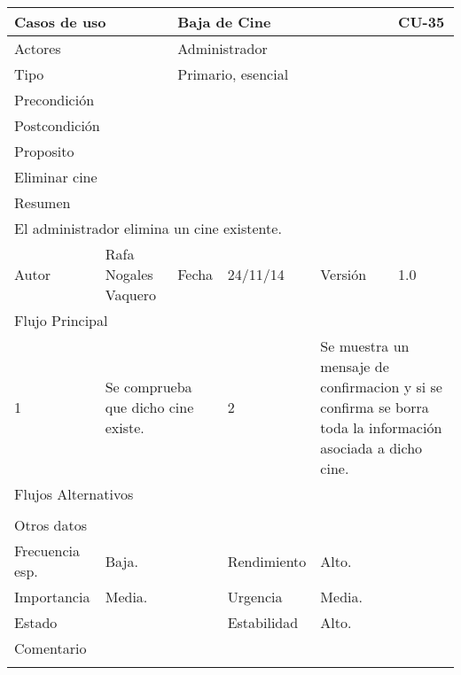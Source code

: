\documentclass{article}
\begin{document}
\begin{table}[h]
\begin{tabular}{|l|l|l|l|l|l|}
\hline
\multicolumn{2}{|p{2cm}|}{Casos de uso}  & \multicolumn{3}{p{7cm}|}{Baja de Cine} & CU-35 \\
\hline
\multicolumn{2}{|p{2cm}|}{Actores}       & \multicolumn{4}{p{8cm}|}{Administrador}        \\
\hline
\multicolumn{2}{|p{2cm}|}{Tipo}          & \multicolumn{4}{p{8cm}|}{Primario, esencial}        \\
\hline
\multicolumn{2}{|p{2cm}|}{Precondición}  & \multicolumn{4}{p{8cm}|}{}        \\
\hline
\multicolumn{2}{|p{2cm}|}{Postcondición} & \multicolumn{4}{p{8cm}|}{}        \\
\hline
\multicolumn{6}{|p{10cm}|}{Proposito}                                   \\
\hline
\multicolumn{6}{|p{10cm}|}{Eliminar cine}                                            \\
\hline
\multicolumn{6}{|p{10cm}|}{Resumen}                                 \\
\hline
\multicolumn{6}{|p{10cm}|}{El administrador elimina un cine existente.}                                            \\
\hline
Autor         &       Rafa Nogales Vaquero        &  Fecha   &  24/11/14   &   Versión  & 1.0\\
\hline
\multicolumn{6}{|p{10cm}|}{Flujo Principal}\\
\hline
\multicolumn{1}{|p{1cm}|}{1} & \multicolumn{2}{p{3cm}}{Se comprueba que dicho cine existe.} & \multicolumn{1}{|p{1cm}|}{2} & \multicolumn{2}{p{3cm}|}{Se muestra un mensaje de confirmacion y si se confirma se borra toda la información asociada a dicho cine.}\\
\hline
\multicolumn{6}{|p{10cm}|}{Flujos Alternativos}\\
\hline
\multicolumn{1}{|p{1cm}}{} & \multicolumn{5}{|p{9cm}|}{}\\
\hline
\multicolumn{6}{|p{10cm}|}{Otros datos}\\
\hline
\multicolumn{1}{|p{2cm}|}{Frecuencia esp.} & \multicolumn{2}{p{3cm}}{Baja.} & \multicolumn{1}{|p{2cm}|}{Rendimiento} & \multicolumn{2}{p{3cm}|}{Alto.}\\
\hline
\multicolumn{1}{|p{2cm}|}{Importancia} & \multicolumn{2}{p{3cm}}{Media.} & \multicolumn{1}{|p{2cm}|}{Urgencia} & \multicolumn{2}{p{3cm}|}{Media.}\\
\hline
\multicolumn{1}{|p{2cm}|}{Estado} & \multicolumn{2}{p{3cm}}{} & \multicolumn{1}{|p{2cm}|}{Estabilidad} & \multicolumn{2}{p{3cm}|}{Alto.}\\
\hline
\multicolumn{6}{|p{10cm}|}{Comentario}\\
\hline
\multicolumn{6}{|p{10cm}|}{}\\
\hline
\end{tabular}
\end{table}
\end{document}
